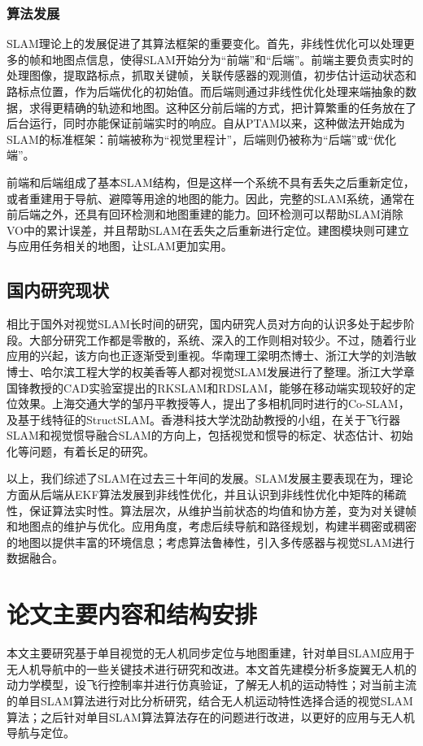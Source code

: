 \subsubsection*{算法发展}
SLAM理论上的发展促进了其算法框架的重要变化。首先，非线性优化可以处理更多的帧和地图点信息，使得SLAM开始分为“前端”和“后端”。前端主要负责实时的处理图像，提取路标点，抓取关键帧，关联传感器的观测值，初步估计运动状态和路标点位置，作为后端优化的初始值。而后端则通过非线性优化处理来端抽象的数据，求得更精确的轨迹和地图。这种区分前后端的方式，把计算繁重的任务放在了后台运行，同时亦能保证前端实时的响应。自从PTAM以来，这种做法开始成为SLAM的标准框架：前端被称为“视觉里程计”\upcite{}，后端则仍被称为“后端”或“优化端”。

前端和后端组成了基本SLAM结构，但是这样一个系统不具有丢失之后重新定位，或者重建用于导航、避障等用途的地图的能力。因此，完整的SLAM系统，通常在前后端之外，还具有回环检测和地图重建的能力。回环检测可以帮助SLAM消除 VO中的累计误差，并且帮助SLAM在丢失之后重新进行定位。建图模块则可建立与应用任务相关的地图，让SLAM更加实用。


\subsection{国内研究现状}
相比于国外对视觉SLAM长时间的研究，国内研究人员对方向的认识多处于起步阶段。大部分研究工作都是零散的，系统、深入的工作则相对较少。不过，随着行业应用的兴起，该方向也正逐渐受到重视。华南理工梁明杰博士\upcite{}、浙江大学的刘浩敏博士\upcite{}、哈尔滨工程大学的权美香\upcite{}等人都对视觉SLAM发展进行了整理。浙江大学章国锋教授的CAD实验室提出的RKSLAM\upcite{}和RDSLAM\upcite{}，能够在移动端实现较好的定位效果。上海交通大学的邹丹平教授等人，提出了多相机同时进行的Co-SLAM\upcite{}，及基于线特征的StructSLAM\upcite{}。香港科技大学沈劭劼教授的小组，在关于飞行器SLAM和视觉惯导融合SLAM的方向上，包括视觉和惯导的标定、状态估计、初始化等问题，有着长足的研究\upcite{}。


以上，我们综述了SLAM在过去三十年间的发展。SLAM发展主要表现在为，理论方面从后端从EKF算法发展到非线性优化，并且认识到非线性优化中矩阵的稀疏性，保证算法实时性。算法层次，从维护当前状态的均值和协方差，变为对关键帧和地图点的维护与优化。应用角度，考虑后续导航和路径规划，构建半稠密或稠密的地图以提供丰富的环境信息；考虑算法鲁棒性，引入多传感器与视觉SLAM进行数据融合。

\section{论文主要内容和结构安排}
本文主要研究基于单目视觉的无人机同步定位与地图重建，针对单目SLAM应用于无人机导航中的一些关键技术进行研究和改进。本文首先建模分析多旋翼无人机的动力学模型，设飞行控制率并进行仿真验证，了解无人机的运动特性；对当前主流的单目SLAM算法进行对比分析研究，结合无人机运动特性选择合适的视觉SLAM算法；之后针对单目SLAM算法算法存在的问题进行改进，以更好的应用与无人机导航与定位。

